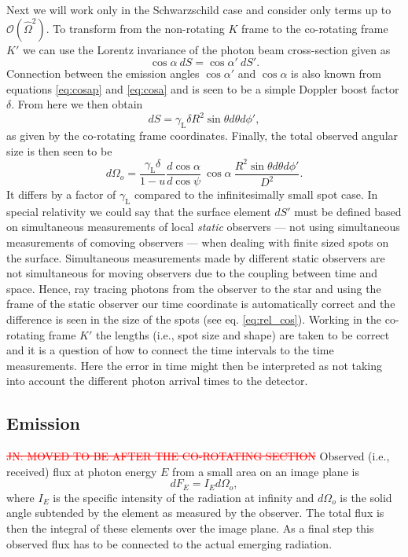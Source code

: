 \documentclass{aa}
\newcommand{\be}{\begin{equation}}
\newcommand{\ee}{\end{equation}}
\newcommand{\refedel}[1]{\textcolor{red}{\sout{#1}}}
\newcommand{\sch}{Schwarzschild }
\newcommand{\Ob}{\ensuremath{\hat{\Omega}}}
\newcommand{\lgamma}{\gamma_{\text{L}}}
\begin{document}
Next we will work only in the \sch case and consider only terms up to $\mathcal{O}(\Ob^2)$.
To transform from the non-rotating $K$ frame to the co-rotating frame $K'$ we can use the Lorentz invariance of the photon beam cross-section given as \citep{Terrell60, LB85}
\be
\cos\alpha ~dS = \cos\alpha' ~dS'.
\ee
Connection between the emission angles $\cos\alpha'$ and $\cos\alpha$ is also known from equations \eqref{eq:cosap} and \eqref{eq:cosa} and is seen to be a simple Doppler boost factor $\delta$.
From here we then obtain
\be
dS = \lgamma \delta R^2 \sin\theta d\theta d\phi',
\ee
as given by the co-rotating frame coordinates.
Finally, the total observed angular size is then seen to be 
\be
d\Omega_o = \frac{\lgamma \delta}{1-u} \frac{d \cos\alpha}{d \cos\psi} ~\cos\alpha ~ \frac{R^2 \sin\theta d\theta d\phi'}{D^2}.
\ee
It differs by a factor of $\lgamma$ compared to the infinitesimally small spot case.
In special relativity we could say that the surface element $dS'$ must be defined based on simultaneous measurements of local \textit{static} observers --- not using simultaneous measurements of comoving observers --- when dealing with finite sized spots on the surface.
Simultaneous measurements made by different static observers are not simultaneous for moving observers due to the coupling between time and space.
Hence, ray tracing photons from the observer to the star and using the frame of the static observer our time coordinate is automatically correct and the difference is seen in the size of the spots (see eq. \ref{eq:rel_cos}).
Working in the co-rotating frame $K'$ the lengths (i.e., spot size and shape) are taken to be correct and it is a question of how to connect the time intervals to the time measurements.
Here the error in time might then be interpreted as not taking into account the different photon arrival times to the detector.


\subsection{Emission}\label{sect:emission}
\refedel{JN: MOVED TO BE AFTER THE CO-ROTATING SECTION}
Observed (i.e., received) flux at photon energy $E$ from a small area on an image plane is
\be
dF_E = I_E d\Omega_o,
\ee
where $I_E$ is the specific intensity of the radiation at infinity and $d\Omega_o$ is the solid angle subtended by the element as measured by the observer. 
The total flux is then the integral of these elements over the image plane.
As a final step this observed flux has to be connected to the actual emerging radiation.
\end{document}
